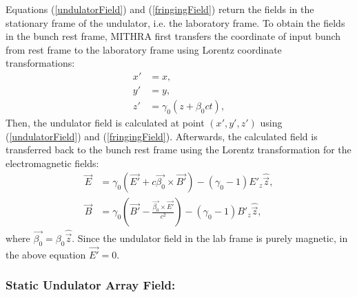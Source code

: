 Equations (\ref{undulatorField}) and (\ref{fringingField}) return the fields in the stationary frame of the undulator, i.e. the laboratory frame.
%
To obtain the fields in the bunch rest frame, MITHRA first transfers the coordinate of input bunch from rest frame to the laboratory frame using Lorentz coordinate transformations:
%
\begin{align}
x' & = x, \nonumber \\
y' & = y, \label{LorentzTransformR2L} \\
z' & = \gamma_0(z+\beta_0ct), \nonumber
\end{align}
%
Then, the undulator field is calculated at point $(x',y',z')$ using (\ref{undulatorField}) and (\ref{fringingField}).
%
Afterwards, the calculated field is transferred back to the bunch rest frame using the Lorentz transformation for the electromagnetic fields:
%
\begin{align}
\label{LorentzTransformElectric}
\vec{E} & = \gamma_0 (\vec{E'}+c\vec{\beta_0} \times \vec{B'}) - (\gamma_0 - 1) E'_z \hat{\vec{z}}, \\
\label{LorentzTransformMagnetic}
\vec{B} & = \gamma_0 (\vec{B'}-\frac{\vec{\beta_0} \times \vec{E'}}{c^2}) - (\gamma_0 - 1) B'_z \hat{\vec{z}},
\end{align}
%
where $\vec{\beta_0}=\beta_0\hat{\vec{z}}$. Since the undulator field in the lab frame is purely magnetic, in the above equation $\vec{E'}=0$.

\subsubsection{Static Undulator Array Field:}

